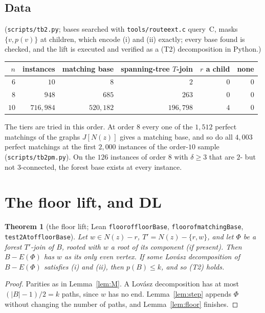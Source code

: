 \documentclass[11pt]{amsart}
\newtheorem{theorem}{Theorem}[section]
\theoremstyle{definition}
\theoremstyle{remark}
\renewcommand{\_}{\oldunderscore\allowbreak}
\begin{document}
\subsection*{Data} (\texttt{scripts/tb2.py}; bases searched with \texttt{tools/route\_ext.c} query~C,
masks $\{v,p(v)\}$ at children, which encode (i) and (ii) exactly; every base found is checked, and
the lift is executed and verified as a (T2) decomposition in Python.)
\begin{center}
\begin{tabular}{rrrrrr}
\toprule
$n$ & instances & matching base & spanning-tree $T$-join & $r$ a child & none\\
\midrule
$6$ & $10$ & $8$ & $2$ & $0$ & $0$\\
$8$ & $948$ & $685$ & $263$ & $0$ & $0$\\
$10$ & $716{,}984$ & $520{,}182$ & $196{,}798$ & $4$ & $0$\\
\bottomrule
\end{tabular}
\end{center}
The tiers are tried in this order. At order $8$ every one of the $1{,}512$ perfect matchings of the
graphs $J[N(z)]$ gives a matching base, and so do all $4{,}003$ perfect matchings at the first $2{,}000$
instances of the order-$10$ sample (\texttt{scripts/tb2\_pm.py}). On the $126$ instances of order $8$ with $\delta\ge3$ that are
$2$- but not $3$-connected, the forest base exists at every instance.

\section{The floor lift, and DL}\label{sec:floorlift}

\begin{theorem}[the floor lift; Lean \texttt{floor\_of\_floorBase}, \texttt{floor\_of\_matchingBase},
\texttt{test2At\_of\_floorBase}]\label{thm:floor}
Let $w\in N(z)-r$, $T'=N(z)-\{r,w\}$, and let $\Phi$ be a forest $T'$-join of $B$, rooted with $w$ a
root of its component (if present). Then $B-E(\Phi)$ has $w$ as its only even vertex. If some Lov\'asz
decomposition of $B-E(\Phi)$ satisfies (i) and (ii), then $p(B)\le k$, and so (T2) holds.
\end{theorem}

\begin{proof}
Parities as in Lemma~\ref{lem:M}. A Lov\'asz decomposition has at most $(|B|-1)/2=k$ paths, since $w$
has no end. Lemma~\ref{lem:step} appends $\Phi$ without changing the number of paths, and
Lemma~\ref{lem:floor} finishes.
\end{proof}
\end{document}

